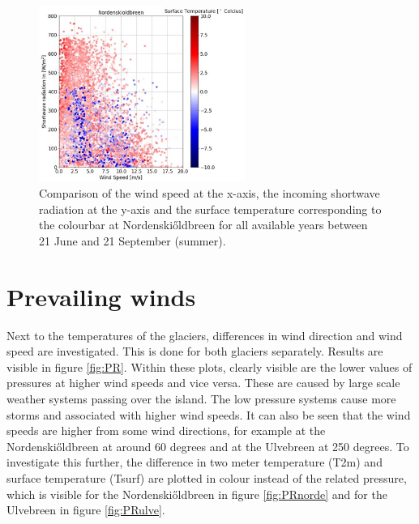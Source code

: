 \documentclass[11pt]{report}
\begin{document}
\begin{figure}[H]
\centering{}
    \includegraphics[scale=1, width=0.6\textwidth]{Thut-Sin.jpg}
    \caption{Comparison of the wind speed at the x-axis, the incoming shortwave radiation at the y-axis and the surface temperature corresponding to the colourbar at Nordenski\H{o}ldbreen for all available years between 21 June and 21 September (summer).}
    \label{fig:Thut2}
\end{figure}

\section{Prevailing winds}\label{sec:katw}
Next to the temperatures of the glaciers, differences in wind direction and wind speed are investigated. This is done for both glaciers separately. Results are visible in figure \ref{fig:PR}. Within these plots, clearly visible are the lower values of pressures at higher wind speeds and vice versa. These are caused by large scale weather systems passing over the island. The low pressure systems cause more storms and associated with higher wind speeds. It can also be seen that the wind speeds are higher from some wind directions, for example at the Nordenski\H{o}ldbreen at around 60 degrees and at the Ulvebreen at 250 degrees. To investigate this further, the difference in two meter temperature (T2m) and surface temperature (Tsurf) are plotted in colour instead of the related pressure, which is visible for the Nordenski\H{o}ldbreen in figure \ref{fig:PRnorde} and for the Ulvebreen in figure \ref{fig:PRulve}. 
\end{document}
